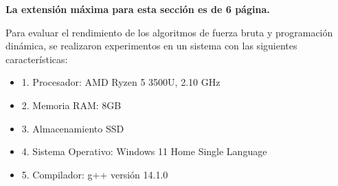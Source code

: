 \begin{mdframed}
    \textbf{La extensión máxima para esta sección es de 6 página.}
\end{mdframed}

Para evaluar el rendimiento de los algoritmos de fuerza bruta y programación dinámica, se realizaron experimentos en un sistema con las siguientes características: 

\begin{itemize}
\item1.	Procesador: AMD Ryzen 5 3500U, 2.10 GHz
\item2.	Memoria RAM: 8GB
\item3.	Almacenamiento SSD
\item4. Sistema Operativo: Windows 11 Home Single Language
\item5. Compilador: g++ versión 14.1.0
\end{itemize}
